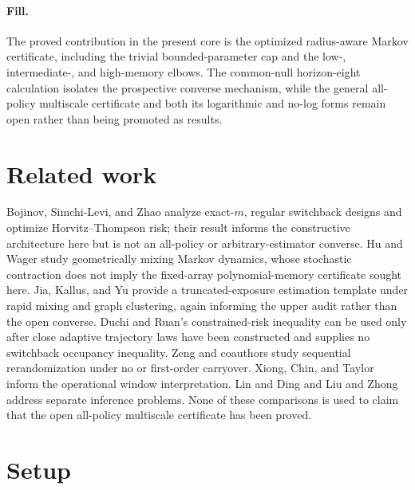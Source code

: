 \documentclass{article}
\begin{document}
\paragraph{Fill.} The proved contribution in the present core is the optimized radius-aware Markov certificate, including the trivial bounded-parameter cap and the low-, intermediate-, and high-memory elbows.  The common-null horizon-eight calculation isolates the prospective converse mechanism, while the general all-policy multiscale certificate and both its logarithmic and no-log forms remain open rather than being promoted as results.

\section{Related work}

Bojinov, Simchi-Levi, and Zhao analyze exact-\(m\), regular switchback designs and optimize Horvitz--Thompson risk; their result informs the constructive architecture here but is not an all-policy or arbitrary-estimator converse.  Hu and Wager study geometrically mixing Markov dynamics, whose stochastic contraction does not imply the fixed-array polynomial-memory certificate sought here.  Jia, Kallus, and Yu provide a truncated-exposure estimation template under rapid mixing and graph clustering, again informing the upper audit rather than the open converse.  Duchi and Ruan's constrained-risk inequality can be used only after close adaptive trajectory laws have been constructed and supplies no switchback occupancy inequality.  Zeng and coauthors study sequential rerandomization under no or first-order carryover.  Xiong, Chin, and Taylor inform the operational window interpretation.  Lin and Ding and Liu and Zhong address separate inference problems.  None of these comparisons is used to claim that the open all-policy multiscale certificate has been proved.

\section{Setup}
\end{document}
